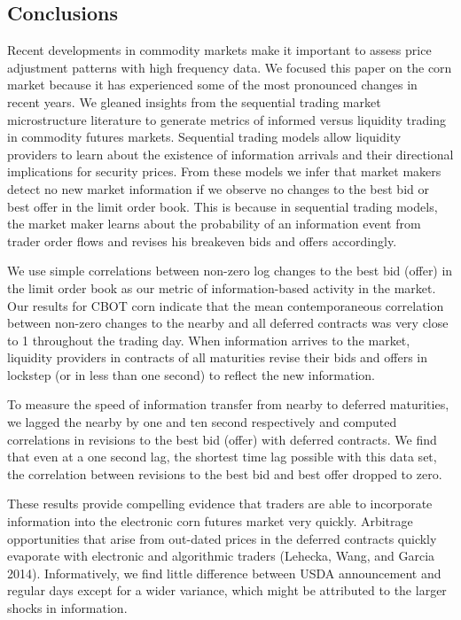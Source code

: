 \documentclass[review,12pt]{elsarticle}
\begin{document}
\begin{linenumbers}
\section{Conclusions}\label{conclusions}

Recent developments in commodity markets make it important to assess
price adjustment patterns with high frequency data. We focused this
paper on the corn market because it has experienced some of the most
pronounced changes in recent years. We gleaned insights from the
sequential trading market microstructure literature to generate metrics
of informed versus liquidity trading in commodity futures markets.
Sequential trading models allow liquidity providers to learn about the
existence of information arrivals and their directional implications for
security prices. From these models we infer that market makers detect no
new market information if we observe no changes to the best bid or best
offer in the limit order book. This is because in sequential trading
models, the market maker learns about the probability of an information
event from trader order flows and revises his breakeven bids and offers
accordingly.

We use simple correlations between non-zero log changes to the best bid
(offer) in the limit order book as our metric of information-based
activity in the market. Our results for CBOT corn indicate that the mean
contemporaneous correlation between non-zero changes to the nearby and
all deferred contracts was very close to 1 throughout the trading day.
When information arrives to the market, liquidity providers in contracts
of all maturities revise their bids and offers in lockstep (or in less
than one second) to reflect the new information.

To measure the speed of information transfer from nearby to deferred
maturities, we lagged the nearby by one and ten second respectively and
computed correlations in revisions to the best bid (offer) with deferred
contracts. We find that even at a one second lag, the shortest time lag
possible with this data set, the correlation between revisions to the
best bid and best offer dropped to zero.

These results provide compelling evidence that traders are able to
incorporate information into the electronic corn futures market very
quickly. Arbitrage opportunities that arise from out-dated prices in the
deferred contracts quickly evaporate with electronic and algorithmic
traders (Lehecka, Wang, and Garcia 2014). Informatively, we find little
difference between USDA announcement and regular days except for a wider
variance, which might be attributed to the larger shocks in information.


\end{linenumbers}
\end{document}
